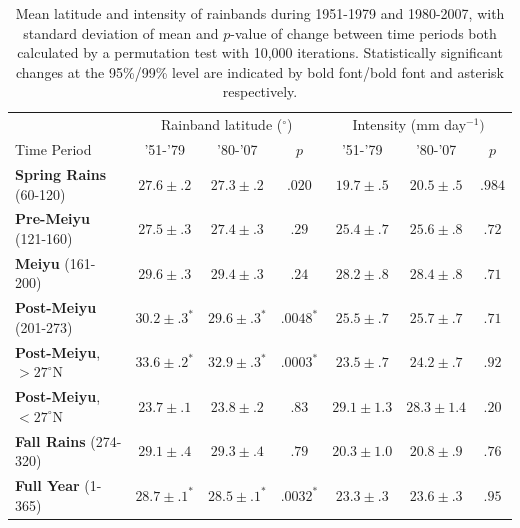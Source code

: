 \documentclass{ametsoc}
\begin{document}
\begin{table}

\centering

\caption{Mean latitude and intensity of rainbands during 1951-1979 and 1980-2007, with standard deviation of mean and $p$-value of change between time periods both calculated by a permutation test with 10,000 iterations. Statistically significant changes at the 95\%/99\% level are indicated by bold font/bold font and asterisk respectively.}

\begin{tabular}{ l c c c c c c}
	& \multicolumn{3}{c}{Rainband latitude ($^\circ$)} & \multicolumn{3}{c}{Intensity (mm day$^{-1})$} \\
	Time Period & '51-'79 & '80-'07 & $p$ & '51-'79 & '80-'07 & $p$ \\
	\hline	
	\textbf{Spring Rains} (60-120)		& $\boldsymbol{27.6 \pm .2}$ & $\boldsymbol{27.3 \pm .2}$ & $ \boldsymbol{.020} $ 		& $\boldsymbol{19.7 \pm .5}$ 	& $\boldsymbol{20.5 \pm .5} $ & $\boldsymbol{.984}$ \\
	\textbf{Pre-Meiyu} (121-160) 		& $27.5 \pm .3$ & $27.4 \pm .3$ & $ .29 $ 		& $25.4 \pm .7$ 	& $25.6 \pm .8	$ & $.72$ \\
	\textbf{Meiyu} (161-200)			& $29.6 \pm .3$ & $29.4 \pm .3$ & $ .24 $ 		& $28.2 \pm .8$ 	& $28.4 \pm .8	$  & $.71$ \\
	\textbf{Post-Meiyu} (201-273)		& $\boldsymbol{30.2 \pm .3^*}$ & $\boldsymbol{29.6 \pm .3^*}$ & $\boldsymbol{.0048^*} $	& $25.5 \pm .7$ 	& $25.7 \pm .7	$ & $.71$ \\
	\textbf{Post-Meiyu}, $>27^\circ$N 	& $\boldsymbol{33.6 \pm .2^*}$ & $\boldsymbol{32.9 \pm .3^*}$ & $\boldsymbol{.0003^*} $ 	& $23.5 \pm .7$ 	& $24.2 \pm .7	$ & $.92$ \\
	\textbf{Post-Meiyu}, $<27^\circ$N 	& $23.7 \pm .1 $ & $23.8 \pm .2$ & $ .83 $ 	& $29.1 \pm 1.3$ 	& $28.3 \pm 1.4	$ & $.20$  \\
	\textbf{Fall Rains} (274-320)			& $29.1 \pm .4 $ & $29.3 \pm .4$ & $ .79 $ 	& $20.3 \pm 1.0$ 	& $20.8 \pm .9	$ & $.76$ \\
	\textbf{Full Year} (1-365)			& $\boldsymbol{28.7 \pm .1^*}$ & $\boldsymbol{28.5 \pm .1^*}$ & $\boldsymbol{.0032^*}$ 	& $23.3 \pm .3$ 	& $23.6 \pm .3	$ & $.95$ \\

\end{tabular}
\label{tab:t36}
\end{table}
\end{document}
